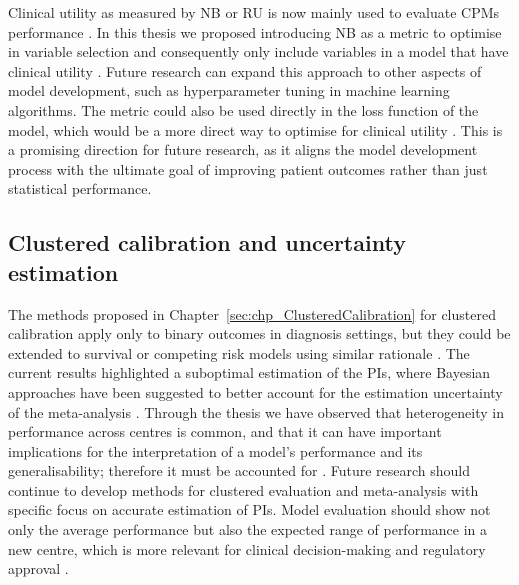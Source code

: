 Clinical utility as measured by \gls{NB} or \gls{RU} is now mainly used to evaluate \glspl{CPM} performance \cite{vancalsterReportingInterpretingDecision2018}. In this thesis we proposed introducing \gls{NB} as a metric to optimise in variable selection and consequently only include variables in a model that have clinical utility \cite{varsel}. Future research can expand this approach to other aspects of model development, such as hyperparameter tuning in machine learning algorithms. The metric could also be used directly in the loss function of the model, which would be a more direct way to optimise for clinical utility \cite{vickersHypothesisNetBenefit2025,chiLearningInterpretableRisk2026}. This is a promising direction for future research, as it aligns the model development process with the ultimate goal of improving patient outcomes rather than just statistical performance.

\subsection{Clustered calibration and uncertainty estimation}

The methods proposed in Chapter~\ref{sec:chp_ClusteredCalibration} for clustered calibration apply only to binary outcomes in diagnosis settings, but they could be extended to survival or competing risk models using similar rationale \cite{austinGraphicalCalibrationCurves2022,austinGraphicalCalibrationCurves2020,barrenadaClusteredFlexibleCalibration2026}. The current results highlighted a suboptimal estimation of the \glspl{PI}, where Bayesian approaches have been suggested to better account for the estimation uncertainty of the meta-analysis \cite{partlettRandomEffectsMetaanalysis2017}. Through the thesis we have observed that heterogeneity in performance across centres is common, and that it can have important implications for the interpretation of a model's performance and its generalisability; therefore it must be accounted for \cite{barrenadaADNEXRiskPrediction2024,barrenadaHeadHeadComparison2025}. Future research should continue to develop methods for clustered evaluation and meta-analysis with specific focus on accurate estimation of \glspl{PI}. Model evaluation should show not only the average performance but also the expected range of performance in a new centre, which is more relevant for clinical decision-making and regulatory approval \cite{vancalsterPerformanceEvaluationPredictive2024}.

